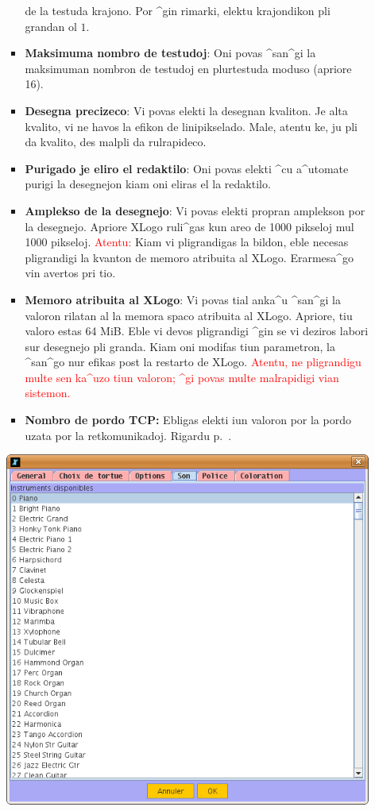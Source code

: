 \begin{itemize}
\begin{itemize}
\begin{itemize}
      de la testuda krajono.  Por ^gin rimarki, elektu krajondikon pli
      grandan ol $1$.
    \item \textbf{Maksimuma nombro de testudoj}: Oni povas ^san^gi la
      maksimuman nombron de testudoj en plurtestuda moduso (apriore
      16).
    \item \textbf{Desegna precizeco}: Vi povas elekti la desegnan
      kvaliton.  Je alta kvalito, vi ne havos la efikon de
      linipikselado.  Male, atentu ke, ju pli da kvalito, des malpli da
      rulrapideco.
    \item \textbf{Purigado je eliro el redaktilo}: Oni povas elekti
      ^cu a^utomate purigi la desegnejon kiam oni eliras el la
      redaktilo.
    \item \textbf{Amplekso de la desegnejo}: Vi povas elekti propran
      amplekson por la desegnejo.  Apriore XLogo ruli^gas kun areo de
      1000 pikseloj mul 1000 pikseloj. \textcolor{red} {Atentu:} Kiam
      vi pligrandigas la bildon, eble necesas pligrandigi la kvanton
      de memoro atribuita al XLogo.  Erarmesa^go vin avertos pri tio.
    \item \textbf{Memoro atribuita al XLogo}: Vi povas tial anka^u
      ^san^gi la valoron rilatan al la memora spaco atribuita al
      XLogo.  Apriore, tiu valoro estas 64 MiB.  Eble vi devos
      pligrandigi ^gin se vi deziros labori sur desegnejo pli granda.
      Kiam oni modifas tiun parametron, la ^san^go nur efikas post la
      restarto de XLogo. \textcolor{red} {Atentu, ne pligrandigu multe
        sen ka^uzo tiun valoron; ^gi povas multe malrapidigi vian
        sistemon.}
    \item \textbf{Nombro de pordo TCP:} Ebligas elekti iun valoron por
      la pordo uzata por la retkomunikadoj.  Rigardu
      p.~\pageref{reseau}.
    \end{itemize}
    \begin{center}
      \includegraphics[scale=0.4]{bildoj/CapturePref4.png}

\end{center}
\end{itemize}
\end{itemize}
